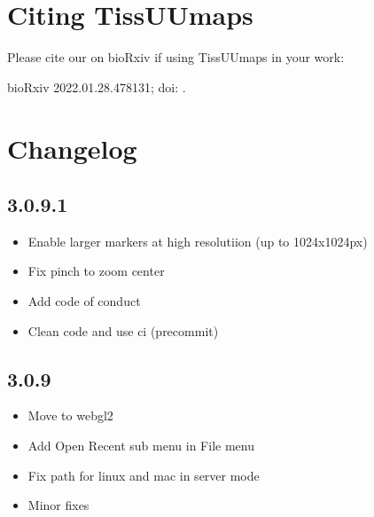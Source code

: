 \documentclass[letterpaper,10pt,english,openany,oneside]{sphinxmanual}
\begin{document}
\sphinxstepscope


\section{Citing TissUUmaps}
\label{\detokenize{docs/intro/citing:citing-tissuumaps}}\label{\detokenize{docs/intro/citing::doc}}
\sphinxAtStartPar
Please cite our  on bioRxiv if using TissUUmaps in your work:

\sphinxAtStartPar
{}  bioRxiv 2022.01.28.478131; doi: .

\sphinxstepscope


\section{Changelog}
\label{\detokenize{docs/intro/versions:changelog}}\label{\detokenize{docs/intro/versions::doc}}

\subsection{3.0.9.1}
\label{\detokenize{docs/intro/versions:id1}}\begin{itemize}
\item {} 
\sphinxAtStartPar
Enable larger markers at high resolutiion (up to 1024x1024px)

\item {} 
\sphinxAtStartPar
Fix pinch to zoom center

\item {} 
\sphinxAtStartPar
Add code of conduct

\item {} 
\sphinxAtStartPar
Clean code and use ci (pre\sphinxhyphen{}commit)

\end{itemize}


\subsection{3.0.9}
\label{\detokenize{docs/intro/versions:id2}}\begin{itemize}
\item {} 
\sphinxAtStartPar
Move to webgl2

\item {} 
\sphinxAtStartPar
Add Open Recent sub menu in File menu

\item {} 
\sphinxAtStartPar
Fix path for linux and mac in server mode

\item {} 
\sphinxAtStartPar
Minor fixes

\end{itemize}
\end{document}
